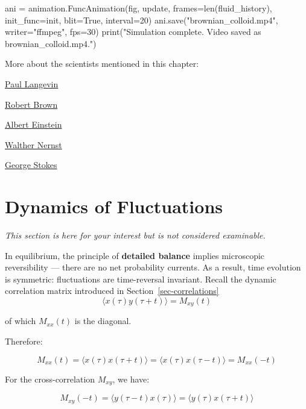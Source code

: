 \documentclass[
  letterpaper,
  enabledeprecatedfontcommands]{report}
\newenvironment{Shaded}{\begin{snugshade}}{\end{snugshade}}
\newcommand{\BuiltInTok}[1]{\textcolor[rgb]{0.00,0.23,0.31}{#1}}
\newcommand{\DecValTok}[1]{\textcolor[rgb]{0.68,0.00,0.00}{#1}}
\newcommand{\NormalTok}[1]{\textcolor[rgb]{0.00,0.23,0.31}{#1}}
\newcommand{\OperatorTok}[1]{\textcolor[rgb]{0.37,0.37,0.37}{#1}}
\newcommand{\StringTok}[1]{\textcolor[rgb]{0.13,0.47,0.30}{#1}}
\newcommand{\VariableTok}[1]{\textcolor[rgb]{0.07,0.07,0.07}{#1}}
\begin{document}
\begin{Shaded}
\begin{Highlighting}[]
\NormalTok{ani }\OperatorTok{=}\NormalTok{ animation.FuncAnimation(fig, update, frames}\OperatorTok{=}\BuiltInTok{len}\NormalTok{(fluid\_history), init\_func}\OperatorTok{=}\NormalTok{init, blit}\OperatorTok{=}\VariableTok{True}\NormalTok{, interval}\OperatorTok{=}\DecValTok{20}\NormalTok{)}
\NormalTok{ani.save(}\StringTok{"brownian\_colloid.mp4"}\NormalTok{, writer}\OperatorTok{=}\StringTok{"ffmpeg"}\NormalTok{, fps}\OperatorTok{=}\DecValTok{30}\NormalTok{)}
\BuiltInTok{print}\NormalTok{(}\StringTok{"Simulation complete. Video saved as \textquotesingle{}brownian\_colloid.mp4\textquotesingle{}."}\NormalTok{)}
\end{Highlighting}
\end{Shaded}

More about the scientists mentioned in this chapter:

\href{https://en.wikipedia.org/wiki/Paul_Langevin}{Paul Langevin}

\href{https://en.wikipedia.org/wiki/Robert_Brown_(botanist,_born_1773)}{Robert
Brown}

\href{https://en.wikipedia.org/wiki/Albert_Einstein}{Albert Einstein}

\href{https://en.wikipedia.org/wiki/Walther_Nernst}{Walther Nernst}

\href{https://en.wikipedia.org/wiki/Sir_George_Stokes,_1st_Baronet}{George
Stokes}

\chapter{Dynamics of Fluctuations}\label{dynamics-of-fluctuations}

\emph{This section is here for your interest but is not considered
examinable.}

In equilibrium, the principle of \textbf{detailed balance} implies
microscopic reversibility --- there are no net probability currents. As
a result, time evolution is symmetric: fluctuations are time-reversal
invariant. Recall the dynamic correlation matrix introduced in
Section~\ref{sec-correlations} \[
\langle x(\tau) y(\tau + t) \rangle = M_{xy}(t)
\]

of which \(M_{xx}(t)\) is the diagonal.

Therefore:

\[
M_{xx}(t) = \langle x(\tau) x(\tau + t) \rangle = \langle x(\tau) x(\tau - t) \rangle = M_{xx}(-t)
\]

For the cross-correlation \(M_{xy}\), we have:

\[
M_{xy}(-t) = \langle y(\tau - t) x(\tau) \rangle = \langle y(\tau) x(\tau + t) \rangle
\]
\end{document}
